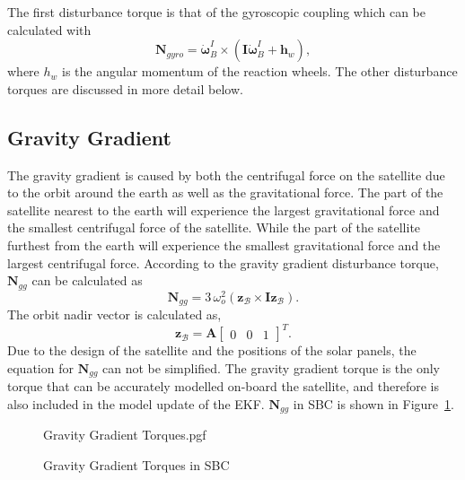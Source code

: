The first disturbance torque is that of the gyroscopic coupling which can be calculated with
\begin{equation}
\mathbf{N}_{gyro} = \boldsymbol{\dot{\omega}}_B^I \times (\mathbf{I}\boldsymbol{\dot{\omega}}_B^I + \mathbf{h}_w),
\end{equation}
where $h_w$ is the angular momentum of the reaction wheels. The other disturbance torques are discussed in more detail below.

\subsection{Gravity Gradient}
The gravity gradient is caused by both the centrifugal force on the satellite due to the orbit around the earth as well as the gravitational force. The part of the satellite nearest to the earth will experience the largest gravitational force and the smallest centrifugal force of the satellite. While the part of the satellite furthest from the earth will experience the smallest gravitational force and the largest centrifugal force. According to \cite{wertz2012spacecraft} the gravity gradient disturbance torque, $\mathbf{N}_{gg}$ can be calculated as 
\begin{equation}
\boldsymbol{N}_{gg} = 3 \, \omega_o^2 (\mathbf{z}_{\mathcal{B}} \times \mathbf{Iz}_{\mathcal{B}}).
\end{equation}
The orbit nadir vector is calculated as,
\begin{equation}
\mathbf{z}_{\mathcal{B}} = \mathbf{A} \begin{bmatrix} 0 & 0 & 1 \end{bmatrix}^T.
\end{equation}
Due to the design of the satellite and the positions of the solar panels, the equation for $\mathbf{N}_{gg}$ can not be simplified. The gravity gradient torque is the only torque that can be accurately modelled on-board the satellite, and therefore is also included in the model update of the EKF. $\mathbf{N}_{gg}$ in SBC is shown in Figure~\ref{fig:GravityGradientTorques}.

\begin{figure}[!htb]
	\centering
	\def\pgfwidth{10cm}
	{Gravity Gradient Torques.pgf}
	
	\caption{Gravity Gradient Torques in SBC}
	\label{fig:GravityGradientTorques}
\end{figure}

